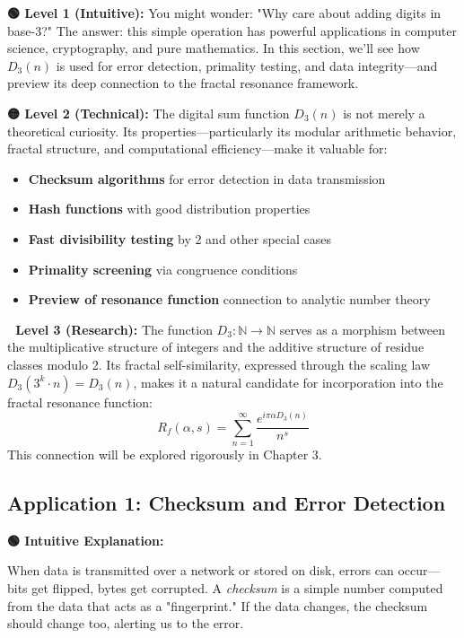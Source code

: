\textbf{🟢 Level 1 (Intuitive):} You might wonder: "Why care about adding digits in base-3?" The answer: this simple operation has powerful applications in computer science, cryptography, and pure mathematics. In this section, we'll see how $D_3(n)$ is used for error detection, primality testing, and data integrity—and preview its deep connection to the fractal resonance framework.

\textbf{🟡 Level 2 (Technical):} The digital sum function $D_3(n)$ is not merely a theoretical curiosity. Its properties—particularly its modular arithmetic behavior, fractal structure, and computational efficiency—make it valuable for:
\begin{itemize}
\item \textbf{Checksum algorithms} for error detection in data transmission
\item \textbf{Hash functions} with good distribution properties
\item \textbf{Fast divisibility testing} by 2 and other special cases
\item \textbf{Primality screening} via congruence conditions
\item \textbf{Preview of resonance function} connection to analytic number theory
\end{itemize}

\textbf{🔴 Level 3 (Research):} The function $D_3: \mathbb{N} \to \mathbb{N}$ serves as a morphism between the multiplicative structure of integers and the additive structure of residue classes modulo 2. Its fractal self-similarity, expressed through the scaling law $D_3(3^k \cdot n) = D_3(n)$, makes it a natural candidate for incorporation into the fractal resonance function:
\begin{equation}
R_f(\alpha, s) = \sum_{n=1}^{\infty} \frac{e^{i\pi\alpha D_3(n)}}{n^s}
\end{equation}
This connection will be explored rigorously in Chapter 3.

\subsection{Application 1: Checksum and Error Detection}

\textbf{🟢 Intuitive Explanation:}

When data is transmitted over a network or stored on disk, errors can occur—bits get flipped, bytes get corrupted. A \textit{checksum} is a simple number computed from the data that acts as a "fingerprint." If the data changes, the checksum should change too, alerting us to the error.

